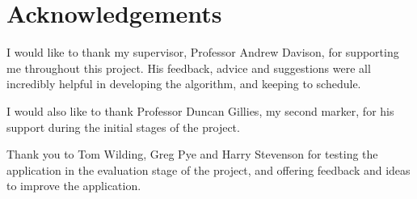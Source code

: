 \section{Acknowledgements}

I would like to thank my supervisor, Professor Andrew Davison, for supporting me throughout this project. His feedback, advice and suggestions were all incredibly helpful in developing the algorithm, and keeping to schedule.

I would also like to thank Professor Duncan Gillies, my second marker, for his support during the initial stages of the project.

Thank you to Tom Wilding, Greg Pye and Harry Stevenson for testing the application in the evaluation stage of the project, and offering feedback and ideas to improve the application.